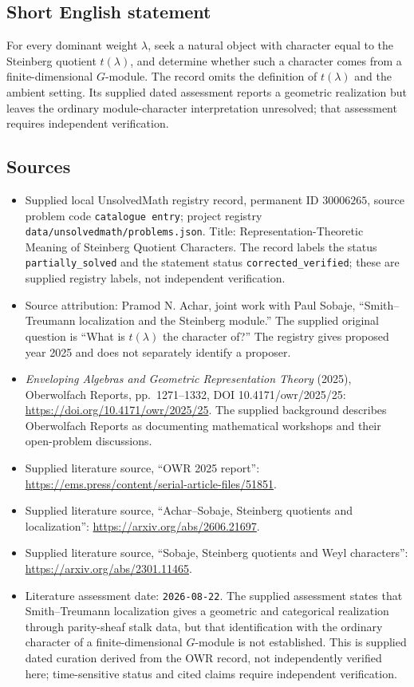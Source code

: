 \documentclass[11pt]{article}
\begin{document}
\subsection{Short English statement}
For every dominant weight \(\lambda\), seek a natural object with character equal to the Steinberg quotient \(t(\lambda)\), and determine whether such a character comes from a finite-dimensional \(G\)-module. The record omits the definition of \(t(\lambda)\) and the ambient setting. Its supplied dated assessment reports a geometric realization but leaves the ordinary module-character interpretation unresolved; that assessment requires independent verification.
\subsection{Sources}
\begin{itemize}
\item Supplied local UnsolvedMath registry record, permanent ID \(30006265\), source problem code \texttt{catalogue entry}; project registry \texttt{data/unsolvedmath/problems.json}. Title: Representation-Theoretic Meaning of Steinberg Quotient Characters. The record labels the status \texttt{partially\_solved} and the statement status \texttt{corrected\_verified}; these are supplied registry labels, not independent verification.
\item Source attribution: Pramod N. Achar, joint work with Paul Sobaje, ``Smith--Treumann localization and the Steinberg module.'' The supplied original question is ``What is \(t(\lambda)\) the character of?'' The registry gives proposed year 2025 and does not separately identify a proposer.
\item \emph{Enveloping Algebras and Geometric Representation Theory} (2025), Oberwolfach Reports, pp.~1271--1332, DOI 10.4171/owr/2025/25: \url{https://doi.org/10.4171/owr/2025/25}. The supplied background describes Oberwolfach Reports as documenting mathematical workshops and their open-problem discussions.
\item Supplied literature source, ``OWR 2025 report'': \url{https://ems.press/content/serial-article-files/51851}.
\item Supplied literature source, ``Achar--Sobaje, Steinberg quotients and localization'': \url{https://arxiv.org/abs/2606.21697}.
\item Supplied literature source, ``Sobaje, Steinberg quotients and Weyl characters'': \url{https://arxiv.org/abs/2301.11465}.
\item Literature assessment date: \texttt{2026-08-22}. The supplied assessment states that Smith--Treumann localization gives a geometric and categorical realization through parity-sheaf stalk data, but that identification with the ordinary character of a finite-dimensional \(G\)-module is not established. This is supplied dated curation derived from the OWR record, not independently verified here; time-sensitive status and cited claims require independent verification.
\end{itemize}
\end{document}
